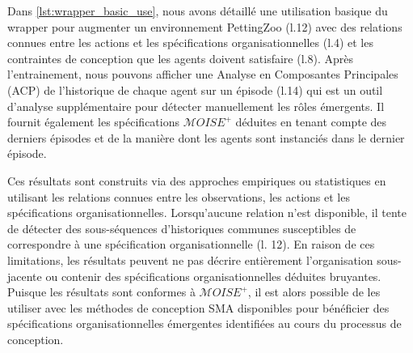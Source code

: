 \documentclass[contribution]{jfsma}
\newcounter{relation}
\begin{document}
Dans \autoref{lst:wrapper_basic_use}, nous avons détaillé une utilisation basique du wrapper pour augmenter un environnement PettingZoo (l.12) avec des relations connues entre les actions et les spécifications organisationnelles (l.4) et les contraintes de conception que les agents doivent satisfaire (l.8). Après l'entrainement, nous pouvons afficher une Analyse en Composantes Principales (ACP) de l'historique de chaque agent sur un épisode (l.14) qui est un outil d'analyse supplémentaire pour détecter manuellement les rôles émergents. Il fournit également les spécifications $\mathcal{M}OISE^+$ déduites en tenant compte des derniers épisodes et de la manière dont les agents sont instanciés dans le dernier épisode.

Ces résultats sont construits via des approches empiriques ou statistiques en utilisant les relations connues entre les observations, les actions et les spécifications organisationnelles. Lorsqu'aucune relation n'est disponible, il tente de détecter des sous-séquences d'historiques communes susceptibles de correspondre à une spécification organisationnelle (l. 12). En raison de ces limitations, les résultats peuvent ne pas décrire entièrement l’organisation sous-jacente ou contenir des spécifications organisationnelles déduites bruyantes. Puisque les résultats sont conformes à $\mathcal{M}OISE^+$, il est alors possible de les utiliser avec les méthodes de conception SMA disponibles pour bénéficier des spécifications organisationnelles émergentes identifiées au cours du processus de conception.


\end{document}
